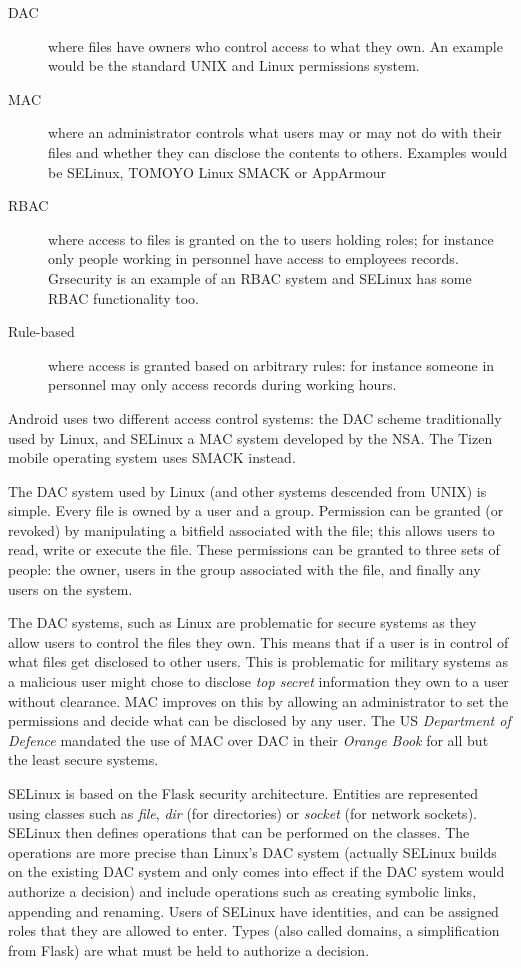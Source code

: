 \documentclass[a4paper]{article}
\begin{document}
\begin{description}
  \item[\ac{DAC}] where files have owners who control access to what they own.
    An example would be the standard UNIX and Linux permissions system.
  \item[\ac{MAC}] where an administrator controls what users may or may not do
    with their files and whether they can disclose the contents to others.
    Examples would be SELinux, TOMOYO Linux SMACK or AppArmour
  \item[\ac{RBAC}] where access to files is granted on the to users holding
    roles; for instance only people working in personnel have access to
    employees records.  Grsecurity is an example of an \ac{RBAC} system and SELinux has some \ac{RBAC} functionality too.
  \item[Rule-based] where access is granted based on arbitrary rules: for
    instance someone in personnel may only access records during working hours.
\end{description}

Android uses two different access control systems: the
\ac{DAC} scheme traditionally used by Linux, and SELinux a \ac{MAC} system
developed by the NSA.  The Tizen mobile
operating system uses SMACK instead.

The \ac{DAC} system used by Linux (and other systems descended from UNIX) is
simple.  Every file is owned by a user and a group.  Permission can be granted
(or revoked) by manipulating a bitfield associated with the file; this allows
users to read, write or execute the file.  These permissions can be granted to
three sets of people: the owner, users in the group associated with the file,
and finally any users on the system.

The \ac{DAC} systems, such as Linux are problematic for secure systems as they
allow users to control the files they own.  This means that if a user is in
control of what files get disclosed to other users.  This is problematic for
military systems as a malicious user might chose to disclose \emph{top secret}
information they own to a user without clearance.  \ac{MAC} improves on this by
allowing an administrator to set the permissions and decide what can be
disclosed by any user.  The US \emph{Department of Defence} mandated the use of
\ac{MAC} over \ac{DAC} in their \emph{Orange Book}\cite{LiliQiu:1985wq} for all but
the least secure systems.

SELinux is based on the Flask security architecture\cite{Spencer:1999vm}.
Entities are represented using classes such as \emph{file}, \emph{dir} (for
directories) or \emph{socket} (for network sockets).  SELinux then defines
operations that can be performed on the classes.  The operations are more
precise than Linux's \ac{DAC} system (actually SELinux builds on the existing
\ac{DAC} system and only comes into effect if the \ac{DAC} system would
authorize a decision) and include operations such as creating symbolic links,
appending and renaming.  Users of SELinux have identities, and can be assigned
roles that they are allowed to enter.  Types (also called domains, a
simplification from Flask) are what must be held to authorize a decision.  
\end{document}
